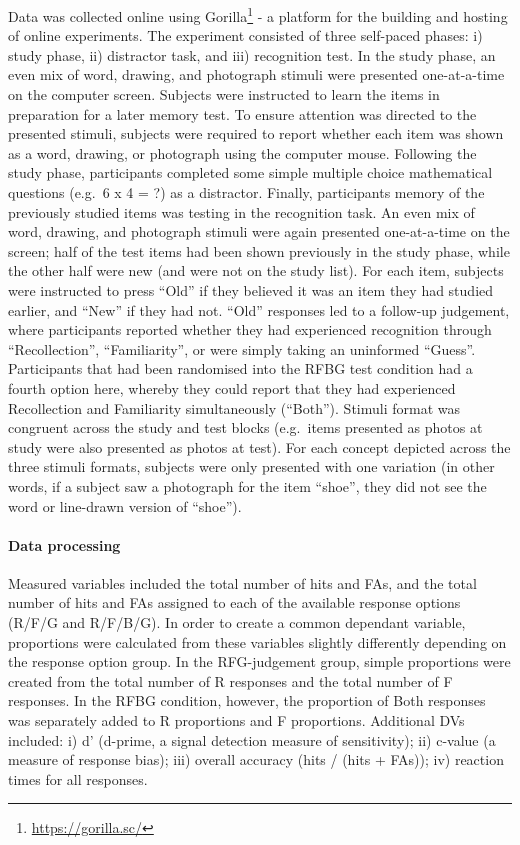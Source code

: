 \documentclass[
  11pt,
]{article}
\begin{document}
Data was collected online using
Gorilla\footnote{\url{https://gorilla.sc/}} - a platform for the
building and hosting of online experiments. The experiment consisted of
three self-paced phases: i) study phase, ii) distractor task, and iii)
recognition test. In the study phase, an even mix of word, drawing, and
photograph stimuli were presented one-at-a-time on the computer screen.
Subjects were instructed to learn the items in preparation for a later
memory test. To ensure attention was directed to the presented stimuli,
subjects were required to report whether each item was shown as a word,
drawing, or photograph using the computer mouse. Following the study
phase, participants completed some simple multiple choice mathematical
questions (e.g.~6 x 4 = ?) as a distractor. Finally, participants memory
of the previously studied items was testing in the recognition task. An
even mix of word, drawing, and photograph stimuli were again presented
one-at-a-time on the screen; half of the test items had been shown
previously in the study phase, while the other half were new (and were
not on the study list). For each item, subjects were instructed to press
``Old'' if they believed it was an item they had studied earlier, and
``New'' if they had not. ``Old'' responses led to a follow-up judgement,
where participants reported whether they had experienced recognition
through ``Recollection'', ``Familiarity'', or were simply taking an
uninformed ``Guess''. Participants that had been randomised into the
RFBG test condition had a fourth option here, whereby they could report
that they had experienced Recollection and Familiarity simultaneously
(``Both''). Stimuli format was congruent across the study and test
blocks (e.g.~items presented as photos at study were also presented as
photos at test). For each concept depicted across the three stimuli
formats, subjects were only presented with one variation (in other
words, if a subject saw a photograph for the item ``shoe'', they did not
see the word or line-drawn version of ``shoe'').

\hypertarget{data-processing-2}{%
\paragraph{Data processing}\label{data-processing-2}}

Measured variables included the total number of hits and FAs, and the
total number of hits and FAs assigned to each of the available response
options (R/F/G and R/F/B/G). In order to create a common dependant
variable, proportions were calculated from these variables slightly
differently depending on the response option group. In the RFG-judgement
group, simple proportions were created from the total number of R
responses and the total number of F responses. In the RFBG condition,
however, the proportion of Both responses was separately added to R
proportions and F proportions. Additional DVs included: i) d' (d-prime,
a signal detection measure of sensitivity); ii) c-value (a measure of
response bias); iii) overall accuracy (hits / (hits + FAs)); iv)
reaction times for all responses.
\end{document}
